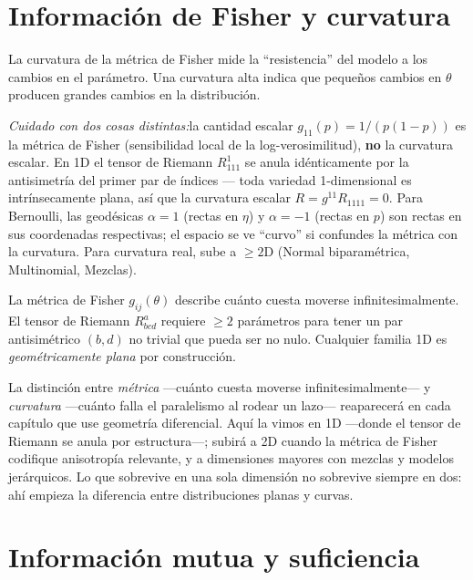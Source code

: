 \section{Información de Fisher y curvatura}

\begin{theorem}
	La curvatura de la métrica de Fisher mide la ``resistencia'' del modelo a los cambios en el parámetro.  Una curvatura alta indica que pequeños cambios en $\theta$ producen grandes cambios en la distribución.
\end{theorem}

\begin{example}
	\emph{Cuidado con dos cosas distintas:}\;la cantidad escalar $g_{11}(p) = 1/(p(1-p))$ es la métrica de Fisher (sensibilidad local de la log-verosimilitud), \textbf{no} la curvatura escalar. En 1D el tensor de Riemann $R^1_{111}$ se anula idénticamente por la antisimetría del primer par de índices — toda variedad 1-dimensional es intrínsecamente plana, así que la curvatura escalar $R = g^{11} R_{1 1 1 1} = 0$. Para Bernoulli, las geodésicas $\alpha=1$ (rectas en $\eta$) y $\alpha=-1$ (rectas en $p$) son rectas en sus coordenadas respectivas; el espacio se ve ``curvo'' si confundes la métrica con la curvatura. Para curvatura real, sube a $\ge 2$D (Normal biparamétrica, Multinomial, Mezclas).
\begin{remark}
La métrica de Fisher $g_{ij}(\theta)$ describe cuánto cuesta moverse infinitesimalmente. El tensor de Riemann $R^a_{bcd}$ requiere $\ge 2$ parámetros para tener un par antisimétrico $(b,d)$ no trivial que pueda ser no nulo. Cualquier familia 1D es \emph{geométricamente plana} por construcción.	\end{remark}
\end{example}

\bigskip
\noindent
La distinción entre \emph{métrica} ---cuánto cuesta moverse infinitesimalmente--- y \emph{curvatura} ---cuánto falla el paralelismo al rodear un lazo--- reaparecerá en cada capítulo que use geometría diferencial. Aquí la vimos en 1D ---donde el tensor de Riemann se anula por estructura---; subirá a 2D cuando la métrica de Fisher codifique anisotropía relevante, y a dimensiones mayores con mezclas y modelos jerárquicos. Lo que sobrevive en una sola dimensión no sobrevive siempre en dos: ahí empieza la diferencia entre distribuciones planas y curvas.

\section{Información mutua y suficiencia}

